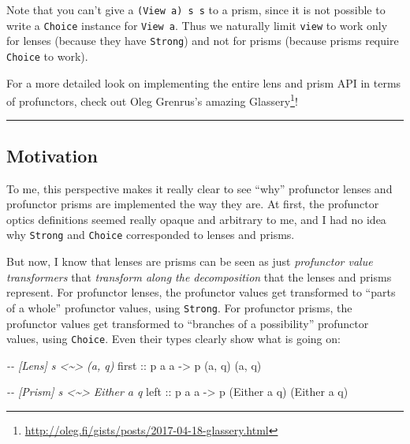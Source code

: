 \documentclass[]{article}
\newenvironment{Shaded}{}{}
\newcommand{\CommentTok}[1]{\textcolor[rgb]{0.38,0.63,0.69}{\textit{#1}}}
\newcommand{\DataTypeTok}[1]{\textcolor[rgb]{0.56,0.13,0.00}{#1}}
\newcommand{\NormalTok}[1]{#1}
\newcommand{\OtherTok}[1]{\textcolor[rgb]{0.00,0.44,0.13}{#1}}
\renewcommand{\href}[2]{#2\footnote{\url{#1}}}
\begin{document}
Note that you can't give a \texttt{(View\ a)\ s\ s} to a prism, since it is not
possible to write a \texttt{Choice} instance for \texttt{View\ a}. Thus we
naturally limit \texttt{view} to work only for lenses (because they have
\texttt{Strong}) and not for prisms (because prisms require \texttt{Choice} to
work).

For a more detailed look on implementing the entire lens and prism API in terms
of profunctors, check out Oleg Grenrus's amazing
\href{http://oleg.fi/gists/posts/2017-04-18-glassery.html}{Glassery}!

\begin{center}\rule{0.5\linewidth}{0.5pt}\end{center}

\subsection{Motivation}\label{motivation}

To me, this perspective makes it really clear to see ``why'' profunctor lenses
and profunctor prisms are implemented the way they are. At first, the profunctor
optics definitions seemed really opaque and arbitrary to me, and I had no idea
why \texttt{Strong} and \texttt{Choice} corresponded to lenses and prisms.

But now, I know that lenses are prisms can be seen as just \emph{profunctor
value transformers} that \emph{transform along the decomposition} that the
lenses and prisms represent. For profunctor lenses, the profunctor values get
transformed to ``parts of a whole'' profunctor values, using \texttt{Strong}.
For profunctor prisms, the profunctor values get transformed to ``branches of a
possibility'' profunctor values, using \texttt{Choice}. Even their types clearly
show what is going on:

\begin{Shaded}
\begin{Highlighting}[]
\CommentTok{{-}{-} [Lens]  s \textless{}\textasciitilde{}\textgreater{} (a, q)}
\OtherTok{first\textquotesingle{} ::}\NormalTok{ p a a }\OtherTok{{-}\textgreater{}}\NormalTok{ p (a, q) (a, q)}

\CommentTok{{-}{-} [Prism] s \textless{}\textasciitilde{}\textgreater{} Either a q}
\OtherTok{left\textquotesingle{}  ::}\NormalTok{ p a a }\OtherTok{{-}\textgreater{}}\NormalTok{ p (}\DataTypeTok{Either}\NormalTok{ a q) (}\DataTypeTok{Either}\NormalTok{ a q)}
\end{Highlighting}
\end{Shaded}
\end{document}
